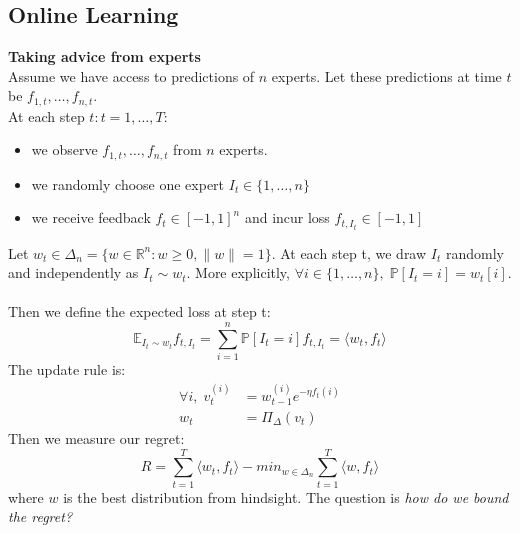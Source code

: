 \subsection{Online Learning}
\textbf{Taking advice from experts}\\
Assume we have access to predictions of $n$ experts. Let these predictions at time $t$ be $f_{1,t}, \ldots, f_{n,t}$.\\
At each step $t : t = 1, \ldots, T$:
\begin{itemize}
    \item we observe $f_{1,t}, \ldots, f_{n,t}$ from $n$ experts.
    \item we randomly choose one expert $I_t \in \{1, \ldots, n\}$
    \item we receive feedback $f_t \in [-1,1]^n$ and incur loss $f_{t,I_t} \in [-1,1]$
\end{itemize}
Let $w_t \in \Delta_n = \{ w \in \mathbb{R}^n : w \geq 0, \|w\| = 1\}$. At each step t, we draw $I_t$ randomly and independently as $I_t \sim w_t$. More explicitly, $\forall i \in \{1, \ldots, n\},\; \mathbb{P}[I_t = i] = w_t[i]$.\\
\\
Then we define the expected loss at step t:
\begin{equation*}
    \mathbb{E}_{I_t \sim w_{t}}f_{t,I_t} =\sum_{i =1}^n\mathbb{P}[I_t = i] f_{t,I_t} = \langle w_{t}, f_t\rangle
\end{equation*}
The update rule is:
\begin{align*}
    \forall i,\; v_t^{(i)} &= w_{t-1}^{(i)}e^{-\eta f_t(i)} \\
    w_t &= \Pi_\Delta (v_t)
\end{align*}
Then we measure our regret:
\begin{equation*}
   R = \sum^T_{t = 1} \langle w_{t}, f_t \rangle - min_{w \in \Delta_n} \sum^{T}_{t = 1} \langle w, f_t \rangle
\end{equation*}
where $w$ is the best distribution from hindsight.
The question is \textit{how do we bound the regret?}
